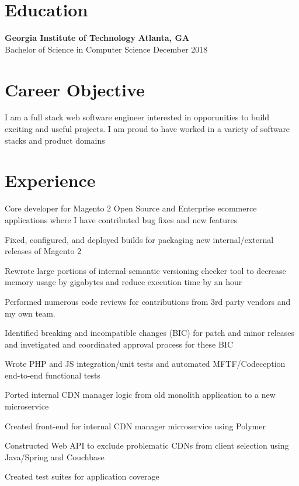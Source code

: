 \documentclass[line]{resume}
\begin{document}
\begin{center}
\end{center}
\section{Education}
\textbf{Georgia Institute of Technology} \hfill \textbf{Atlanta, GA} \\
Bachelor of Science in Computer Science  \hfill December 2018
\section{Career Objective}
I am a full stack web software engineer interested in opporunities to build exciting and useful projects. I am proud to have worked in a variety of software stacks and product domains \\
\section{Experience}
\begin{myitemize}
	\item Core developer for Magento 2 Open Source and Enterprise ecommerce applications where I have contributed bug fixes and new features
	\item Fixed, configured, and deployed builds for packaging new internal/external releases of Magento 2
	\item Rewrote large portions of internal semantic versioning checker tool to decrease memory usage by gigabytes and reduce execution time by an hour
	\item Performed numerous code reviews for contributions from 3rd party vendors and my own team.
	\item Identified breaking and incompatible changes (BIC) for patch and minor releases and invetigated and coordinated approval process for these BIC
	\item Wrote PHP and JS integration/unit tests and automated MFTF/Codeception end-to-end functional tests
\end{myitemize}
\begin{myitemize}
	\item Ported internal CDN manager logic from old monolith application to a new microservice
	\item Created front-end for internal CDN manager microservice using Polymer
	\item Constructed Web API to exclude problematic CDNs from client selection using Java/Spring and Couchbase
	\item Created test suites for application coverage
\end{myitemize}
\end{document}
